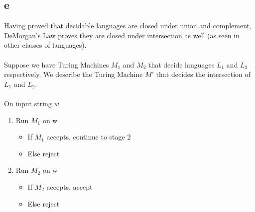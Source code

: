 \documentclass{article}
\begin{document}
\subsection*{e}
Having proved that decidable languages are closed under union and complement, DeMorgan's Law proves they are closed under intersection as well (as seen in other classes of languages).\\\\
Suppose we have Turing Machines $M_1$ and $M_2$ that decide languages $L_1$ and $L_2$ respectively. We describe the Turing Machine $M'$ that decides the intersection of $L_1$ and $L_2$.\\\\
On input string $w$
\begin{enumerate}
    \item Run $M_1$ on w 
    \begin{itemize}
        \item If $M_1$ accepts, continue to stage 2
        \item Else reject
    \end{itemize} 
    \item Run $M_2$ on w
    \begin{itemize}
        \item If $M_2$ accepts, accept
        \item Else reject
    \end{itemize}
\end{enumerate}
\end{document}
